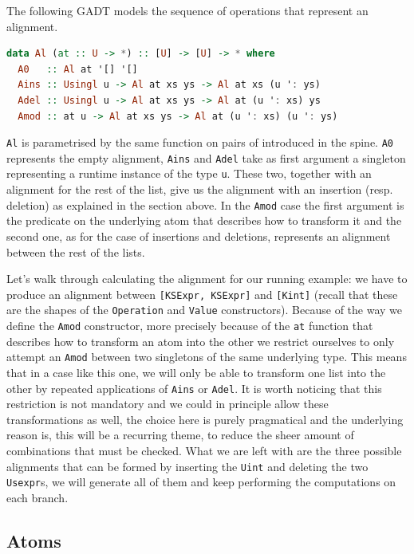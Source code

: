 \documentclass[11pt]{article}
\begin{document}
The following GADT models the sequence of operations that represent an 
alignment.

\begin{lstlisting}[language=haskell]
data Al (at :: U -> *) :: [U] -> [U] -> * where
  A0   :: Al at '[] '[]
  Ains :: Usingl u -> Al at xs ys -> Al at xs (u ': ys)
  Adel :: Usingl u -> Al at xs ys -> Al at (u ': xs) ys
  Amod :: at u -> Al at xs ys -> Al at (u ': xs) (u ': ys)
\end{lstlisting}

\texttt{Al} is parametrised by the same function on pairs of introduced in the spine. 
\texttt{A0} represents the empty alignment, \texttt{Ains} and \texttt{Adel} take as first argument
a singleton representing a runtime instance of the type \texttt{u}. These two, together
with an alignment for the rest of the list, give us the alignment with
an insertion (resp. deletion) as explained in the section above. In the
\texttt{Amod} case the first argument is the predicate on the underlying atom that describes how to transform 
it and the second one, as for the case of insertions and deletions, represents an  
alignment between the rest of the lists. 

Let's walk through calculating the alignment for our running example: we have to 
produce an alignment between \texttt{[KSExpr, KSExpr]} and \texttt{[Kint]} (recall that these are the shapes of the 
\texttt{Operation} and \texttt{Value} constructors). Because of the way we 
define the \texttt{Amod} constructor, more precisely because of the \texttt{at} 
function that describes how to transform an atom into the other we restrict 
ourselves to only attempt an \texttt{Amod} between two singletons of the same underlying 
type. This means that in a case like this one, we will only be able to transform 
one list into the other by repeated applications of \texttt{Ains} or 
\texttt{Adel}. It is worth noticing that this restriction is not mandatory and 
we could in principle allow these transformations as well, the choice here is purely pragmatical and the underlying reason is,
this will be a recurring theme, to reduce the sheer amount of combinations that must be checked.
What we are left with are the three possible alignments that can be formed by inserting the \texttt{Uint}
and deleting the two \texttt{Usexpr}s, we will generate all of them and keep performing 
the computations on each branch. 

\subsection{Atoms}\label{atoms}
\end{document}
